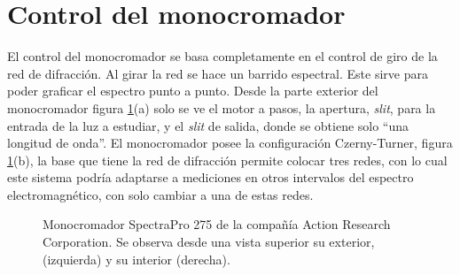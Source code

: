 \section{Control del monocromador}
El control del monocromador se basa completamente en el control de giro de la red de difracción. Al girar la red se hace un barrido espectral. Este sirve para poder graficar el espectro punto a punto. Desde la parte exterior del monocromador figura \ref{fig:spectrapro}(a) solo se ve el motor a pasos, la apertura, \textit{slit}, para la entrada de la luz a estudiar, y el \textit{slit} de salida, donde se obtiene solo ``una longitud de onda''. El monocromador posee la configuración Czerny-Turner, figura \ref{fig:spectrapro}(b), la base que tiene la red de difracción permite colocar tres redes, con lo cual este sistema podría adaptarse a mediciones en otros intervalos del espectro electromagnético, con solo cambiar a una de estas redes. 
\begin{figure}[h]
	\centering
	\caption{Monocromador SpectraPro 275 de la compañía Action Research Corporation. Se observa desde una vista superior su exterior, (izquierda) y su interior (derecha).}
	\label{fig:spectrapro}
\end{figure}


